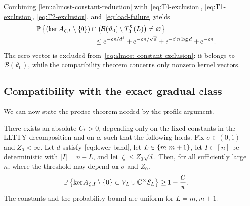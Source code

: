 Combining 
\cref{lem:almost-constant-reduction} with~\eqref{eq:T0-exclusion}, \eqref{eq:T1-exclusion}, \eqref{eq:T2-exclusion}, and~\eqref{eq:load-failure} yields
\begin{align}
  &\Pp\set{(\ker A_{\zeta,I}\setminus\set0)
  \cap\bigl(\mathcal B(\vartheta_0)\setminus T_3^{\mathcal K}(L)\bigr)\ne\varnothing}
  \notag\\
  &\hspace{3cm}\le e^{-cn/d^3}+e^{-cn/\sqrt d}+e^{-c'n\log d}+e^{-cn}.
  \label{eq:almost-constant-exclusion}
\end{align}
The zero vector is excluded from~\eqref{eq:almost-constant-exclusion}: it belongs to $\mathcal B(\vartheta_0)$, while the compatibility theorem concerns only nonzero kernel vectors.

\subsection{Compatibility with the exact gradual class}

We can now state the precise theorem needed by the profile argument.

\begin{theorem}\label{thm:kernel-compatibility}
There exists an absolute $C_*>0$, depending only on the fixed constants in the LLTTY decomposition and on $a$, such that the following holds. Fix $\sigma\in(0,1)$ and $Z_0<\infty$. Let $d$ satisfy~\eqref{eq:lower-band}, let $L\in\left\{m,m+1\right\}$, let $I\subset[n]$ be deterministic with $|I|=n-L$, and let $|\zeta|\le Z_0\sqrt d$. Then, for all sufficiently large $n$, where the threshold may depend on $\sigma$ and $Z_0$,
\begin{equation}\label{eq:kernel-compatibility}
  \mathbb P\left\{\ker A_{\zeta,I}\setminus\left\{0\right\}\subset V_L\cup\mathbb C^{\times}S_L\right\}
  \ge1-\frac Cn.
\end{equation}
The constants and the probability bound are uniform for $L=m,m+1$.
\end{theorem}

